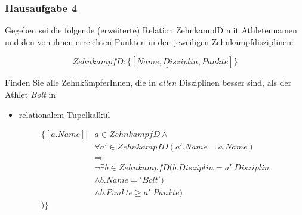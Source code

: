 \begin{frame}[fragile]
	\frametitle{Hausaufgabe 4}
	\vspace{0.25cm}

	\begin{multicols}{2}
		Gegeben sei die folgende (erweiterte) Relation ZehnkampfD mit 
		Athletennamen und den von ihnen erreichten Punkten in den jeweiligen Zehnkampfdisziplinen:

		\[ ZehnkampfD: \{[ \underline{Name, Disziplin}, Punkte ]\} \]

		Finden Sie alle ZehnkämpferInnen, die in \textit{allen} Disziplinen besser sind,
		als der Athlet \textit{Bolt} in
		\begin{itemize}
			\item relationalem Tupelkalkül
		\end{itemize}
		\vfill\columnbreak

		\begin{align*}
			\{ [a.Name] | & a \in ZehnkampfD \wedge \\
						  & \forall a' \in ZehnkampfD(a'.Name = a.Name) \\
						  & \Rightarrow \\
						  & \neg \exists b \in ZehnkampfD (b.Disziplin = a'.Disziplin \\
						  & \wedge b.Name = 'Bolt') \\
						  & \wedge b.Punkte \geq a'.Punkte) \\
			) \}
		\end{align*}
	\end{multicols}
\end{frame}

